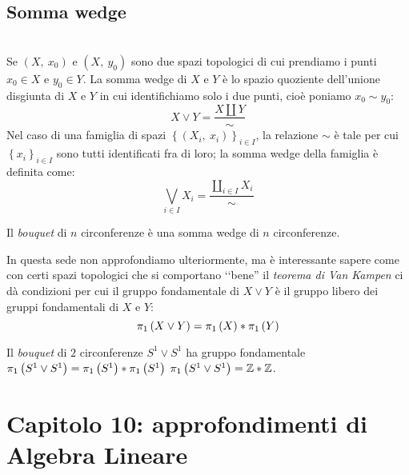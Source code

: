\subsection{Somma wedge}
\begin{define}~{}\\
	Se $\left(X,\ x_0\right)$ e $\left(X,\ y_0\right)$ sono due spazi topologici di cui prendiamo i punti $x_0\in X$ e $y_0\in Y$. La somma wedge di $X$ e $Y$ è lo spazio quoziente dell'unione disgiunta di $X$ e $Y$ in cui identifichiamo solo i due punti, cioè poniamo $x_0\sim y_0$:
	\begin{equation}
		X\vee Y=\frac{X\amalg Y}{\sim}
	\end{equation}
Nel caso di una famiglia di spazi $\left\{\left(X_i,\ x_i\right)\right\}_{i\in I}$, la relazione $\sim$ è tale per cui $\left\{x_i\right\}_{i\in I}$ sono tutti identificati fra di loro; la somma wedge della famiglia è definita come:
\begin{equation*}
	\bigvee_{i\in I} X_i = \frac{\coprod_{i\in I}X_i}{\sim}
\end{equation*}
\end{define}
\begin{example}
	Il \textit{bouquet} di $n$ circonferenze è una somma wedge di $n$ circonferenze.
\end{example}
In questa sede non approfondiamo ulteriormente, ma è interessante sapere come con certi spazi topologici che si comportano ‘‘bene'' il \textit{teorema di Van Kampen} ci dà condizioni per cui il gruppo fondamentale di $X\vee Y$ è il gruppo libero dei gruppi fondamentali di $X$ e $Y$:
\begin{equation}
	\gruf{X\vee Y}{\ }=\gruf{X}{\ }\ast\gruf{Y}{\ }
\end{equation}
\begin{example}
	Il \textit{bouquet} di $2$ circonferenze $S^1\vee S^1$ ha gruppo fondamentale $\gruf{S^1\vee S^1}{\ }=\gruf{S^1}{\ }\ast\gruf{S^1}{\ }$  $\gruf{S^1\vee S^1}{\ }=\integerset\ast\integerset$.
\end{example}
\section{Capitolo 10: approfondimenti di Algebra Lineare}
